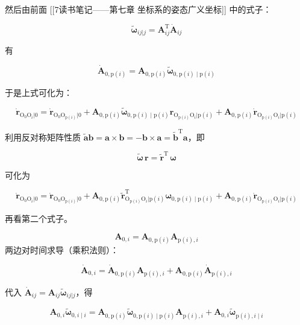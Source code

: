 然后由前面 [[7读书笔记——第七章 坐标系的姿态广义坐标]] 中的式子：

\[
\tilde{\boldsymbol{\omega}}_{ij|j} = \boldsymbol{A}_{ij}^{\mathrm{T}}\dot{\boldsymbol{A}}_{ij}
\]

有

\[
\dot{\boldsymbol{A}}_{0,\mathrm{p}(i)}=\boldsymbol{A}_{0,\mathrm{p}(i)}\tilde{\boldsymbol{\omega}}_{0,\mathrm{p}(i)\mid \mathrm{p}(i)}
\]

于是上式可化为：

\[
\dot{\boldsymbol{r}}_{\mathrm{O}_0\mathrm{O}_i|0}=\dot{\boldsymbol{r}}_{\mathrm{O}_0\mathrm{O}_{\mathrm{p}(i)}|0}+ \boldsymbol{A}_{0,\mathrm{p}(i)}\tilde{\boldsymbol{\omega}}_{0,\mathrm{p}(i)\mid \mathrm{p}(i)}\boldsymbol{r}_{\mathrm{O}_{\mathrm{p}(i)}\mathrm{O}_i|\mathrm{p}(i)}+\boldsymbol{A}_{0,\mathrm{p}(i)}\dot{\boldsymbol{r}}_{\mathrm{O}_{\mathrm{p}(i)}\mathrm{O}_i|\mathrm{p}(i)}
\]

利用反对称矩阵性质 $\tilde{\boldsymbol{a}}\boldsymbol{b}=\boldsymbol{a}\times\boldsymbol{b}=-\boldsymbol{b}\times\boldsymbol{a}=\tilde{\boldsymbol{b}}^{\mathrm{T}}\boldsymbol{a}$，即

\[
\tilde{\boldsymbol{\omega}}\,\boldsymbol{r}=\tilde{\boldsymbol{r}}^{\mathrm{T}}\,\boldsymbol{\omega}
\]

可化为

\[
\dot{\boldsymbol{r}}_{\mathrm{O}_0\mathrm{O}_i|0}=
\dot{\boldsymbol{r}}_{\mathrm{O}_0\mathrm{O}_{\mathrm{p}(i)}|0}+
\boldsymbol{A}_{0,\mathrm{p}(i)}\tilde{\boldsymbol{r}}^{\mathrm{T}}_{\mathrm{O}_{\mathrm{p}(i)}\mathrm{O}_i|\mathrm{p}(i)}\boldsymbol{\omega}_{0,\mathrm{p}(i)\mid \mathrm{p}(i)}+
\boldsymbol{A}_{0,\mathrm{p}(i)}\dot{\boldsymbol{r}}_{\mathrm{O}_{\mathrm{p}(i)}\mathrm{O}_i|\mathrm{p}(i)}
\]

再看第二个式子。

\[
\boldsymbol{A}_{0,i}=\boldsymbol{A}_{0,\mathrm{p}(i)}\boldsymbol{A}_{\mathrm{p}(i),i}
\]
两边对时间求导（乘积法则）：

\[
\dot{\boldsymbol{A}}_{0,i}=\dot{\boldsymbol{A}}_{0,\mathrm{p}(i)}\boldsymbol{A}_{\mathrm{p}(i),i}+\boldsymbol{A}_{0,\mathrm{p}(i)}\dot{\boldsymbol{A}}_{\mathrm{p}(i),i}
\]

代入 $\dot{\boldsymbol{A}}_{ij}=\boldsymbol{A}_{ij}\tilde{\boldsymbol{\omega}}_{ij|j}$，得

\[
\boldsymbol{A}_{0,i}\tilde{\boldsymbol{\omega}}_{0,i\mid i}=\boldsymbol{A}_{0,\mathrm{p}(i)}\tilde{\boldsymbol{\omega}}_{0,\mathrm{p}(i)\mid \mathrm{p}(i)}\boldsymbol{A}_{\mathrm{p}(i),i}+\boldsymbol{A}_{0,i}\tilde{\boldsymbol{\omega}}_{\mathrm{p}(i),i\mid i}
\]

